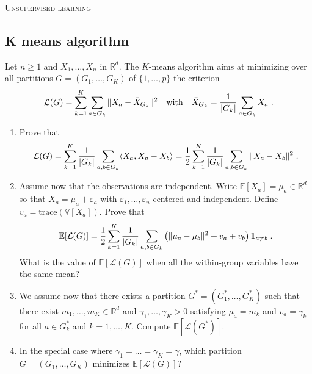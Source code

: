 \documentclass[a4paper,10pt,fleqn]{article}
\newcommand{\R}{\ensuremath{\mathbb{R}}}
\newcommand{\E}{\ensuremath{\mathbb{E}}}
\newcommand{\V}{\ensuremath{\mathbb{V}}}
\newcommand{\1}{\ensuremath{\mathbbm{1}}}
\newcommand{\eps}{\varepsilon}
\newcommand{\crit}{\mathcal{L}}
\begin{document}
\noindent\hrulefill

\begin{center}
\textsc{Unsupervised learning}
\end{center}
\hrulefill

\medskip


\subsection*{K means algorithm}
Let $n\geqslant 1$ and  $X_{1},\ldots,X_{n}$ in $\R^d$.
The $K$-means algorithm aims at minimizing over all partitions $G=(G_{1},\ldots,G_{K})$ of $\{1,\ldots,p\}$ the criterion
$$
\crit(G)=\sum_{k=1}^K\sum_{a\in G_{k}}\|X_{a}-\bar{X}_{G_{k}}\|^2\quad \textrm{with}\quad \bar{X}_{G_{k}}={1\over |G_{k}|}\sum_{a\in G_{k}} X_{a}\;.
$$
\begin{enumerate}
\item Prove that
$$
\crit(G)=\sum_{k=1}^K{1\over |G_{k}|}\sum_{a,b\in G_{k}} \langle X_{a},X_{a}-X_{b}\rangle ={1\over 2}\sum_{k=1}^K{1\over |G_{k}|}\sum_{a,b\in G_{k}} \|X_{a}-X_{b}\|^2\;.
$$
\item Assume now that the observations are independent. Write $\E[X_a] = \mu_{a}\in\R^d$ so that $X_{a}=\mu_{a}+\eps_{a}$ with $\eps_{1},\ldots,\eps_{n}$ centered and independent. Define $v_{a}=\textrm{trace}(\V[X_{a}])$. Prove that
$$
\E[\crit(G)]={1\over 2}\sum_{k=1}^K{1\over |G_{k}|}\sum_{a,b\in G_{k}} \left(\|\mu_{a}-\mu_{b}\|^2+v_{a}+v_{b}\right){\bf 1}_{a\neq b}\;.
$$
What is the value of $\E[\crit(G)]$ when all the within-group variables have the same mean?
\item We assume now that there exists a partition $G^*=(G^*_{1},\ldots,G^*_{K})$ such  that there exist $m_{1},\ldots,m_{K}\in\R^d$ and $\gamma_{1},\ldots,\gamma_{K}>0$ satisfying
$\mu_{a}=m_{k}$ and $v_{a}=\gamma_{k}$ for all $a\in G^*_{k}$ and $k=1,\ldots,K$. Compute $\E[\crit(G^*)]$.
\item In the special case where $\gamma_{1}=\ldots=\gamma_{K}=\gamma$, which partition $G=(G_{1},\ldots,G_{K})$ minimizes $\E[\crit(G)]$?
\end{enumerate}
	
\end{document}
